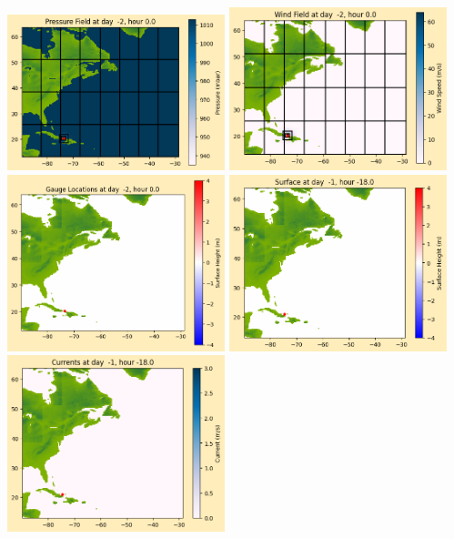 \documentclass[11pt]{article}
\begin{document}
\includegraphics[width=0.475\textwidth]{frame0004fig1012.png}
\vskip 10pt 
\includegraphics[width=0.475\textwidth]{frame0004fig1013.png}
\includegraphics[width=0.475\textwidth]{frame0004fig1014.png}
\vskip 10pt 
\includegraphics[width=0.475\textwidth]{frame0005fig1001.png}
\includegraphics[width=0.475\textwidth]{frame0005fig1002.png}
\end{document}
